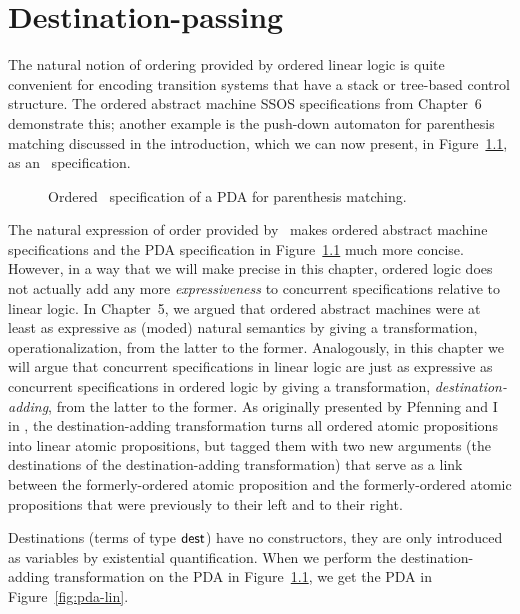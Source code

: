 \chapter{Destination-passing}
\label{chapter-destinations}

The natural notion of ordering provided by ordered linear logic
is quite convenient for encoding transition systems that 
have a stack or tree-based control structure. The ordered
abstract machine SSOS specifications from Chapter~6 demonstrate
this; another example is the push-down automaton for parenthesis
matching discussed in the introduction, which we can now present,
in Figure~\ref{fig:pda-ord}, as an \sls~specification.

\begin{figure}[ht]
\caption{Ordered \sls~specification of a PDA for parenthesis matching.}
\label{fig:pda-ord}
\end{figure}

The natural expression of order provided by \sls~makes ordered
abstract machine specifications and the PDA specification in
Figure~\ref{fig:pda-ord} much more concise. However, in a way that we
will make precise in this chapter, ordered logic does not actually add
any more {\it expressiveness} to concurrent specifications relative to
linear logic. In Chapter~5, we argued that ordered abstract machines
were at least as expressive as (moded) natural semantics by giving a
transformation, operationalization, from the latter to the
former. Analogously, in this chapter we will argue that concurrent
specifications in linear logic are just as expressive as concurrent
specifications in ordered logic by giving a transformation, {\it
  destination-adding}, from the latter to the former.  As 
originally presented by Pfenning and I in \cite{simmons11logical}, 
the destination-adding transformation turns all ordered
atomic propositions into linear atomic propositions, but tagged them
with two new arguments (the destinations of the destination-adding
transformation) that serve as a link between the formerly-ordered
atomic proposition and the formerly-ordered atomic propositions that
were previously to their left and to their right. 

Destinations (terms of type ${\sf dest}$) have no constructors, they
are only introduced as variables by existential quantification.  When
we perform the destination-adding transformation on the PDA in
Figure~\ref{fig:pda-ord}, we get the PDA in Figure~\ref{fig:pda-lin}.


